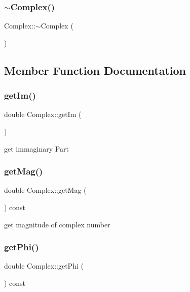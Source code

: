 \subsubsection{\texorpdfstring{$\sim$\+Complex()}{~Complex()}}
{\footnotesize\ttfamily Complex\+::$\sim$\+Complex (\begin{DoxyParamCaption}{ }\end{DoxyParamCaption})\hspace{0.3cm}{\ttfamily [virtual]}}



\subsection{Member Function Documentation}
\mbox{\label{class_complex_adb777696a6536bae109ce0b1380493cb}} 
\subsubsection{\texorpdfstring{get\+Im()}{getIm()}}
{\footnotesize\ttfamily double Complex\+::get\+Im (\begin{DoxyParamCaption}{ }\end{DoxyParamCaption})}



get immaginary Part 

\mbox{\label{class_complex_a58e5404efd8f49c034be2ab82af53461}} 
\subsubsection{\texorpdfstring{get\+Mag()}{getMag()}}
{\footnotesize\ttfamily double Complex\+::get\+Mag (\begin{DoxyParamCaption}{ }\end{DoxyParamCaption}) const}



get magnitude of complex number 

\mbox{\label{class_complex_a4eb4ecde5a206cae05fd0b6500f22fff}} 
\subsubsection{\texorpdfstring{get\+Phi()}{getPhi()}}
{\footnotesize\ttfamily double Complex\+::get\+Phi (\begin{DoxyParamCaption}{ }\end{DoxyParamCaption}) const}



